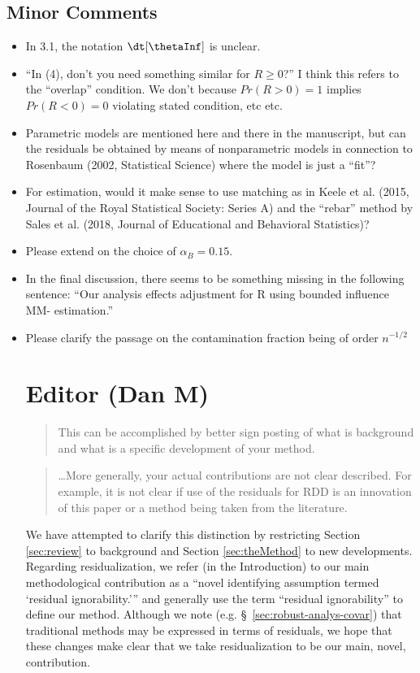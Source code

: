 \documentclass[12pt]{article}
\begin{document}
\subsection{Minor Comments}
\begin{itemize}
\item In 3.1, the notation $\dt[\thetaInf]$ is unclear.
\item ``In (4), don’t you need something similar for $R\ge 0$?'' I
  think this refers to the ``overlap'' condition. We don't because
  $Pr(R>0)=1$ implies $Pr(R<0)=0$ violating stated condition, etc etc.
\item Parametric models are mentioned here and there in the
  manuscript, but can the residuals be obtained by means of
  nonparametric models in connection to Rosenbaum (2002, Statistical
  Science) where the model is just a ``fit''?
\item For estimation, would it make sense to use matching as in Keele
  et al. (2015, Journal of the Royal Statistical Society: Series A)
  and the “rebar” method by Sales et al. (2018, Journal of Educational
  and Behavioral Statistics)?
\item Please extend on the choice of $\alpha_B=0.15$.
\item In the final discussion, there seems to be something missing in
  the following sentence: “Our analysis effects adjustment for R using
  bounded influence MM- estimation.”
\item Please clarify the passage on the contamination fraction being of
order $n^{-1/2}$


\section{Editor (Dan M)}

\begin{quote}
This can be accomplished by better sign posting of what
is background and what is a specific development of your
method.
\end{quote}
\begin{quote}
\dots More generally, your actual contributions
are not clear described. For example, it is not clear if use of the
residuals for RDD is an innovation of this paper or a method being
taken from the literature.
\end{quote}
We have attempted to clarify this distinction by restricting Section
\ref{sec:review} to background and Section \ref{sec:theMethod} to new
developments. Regarding residualization, we refer (in the
Introduction) to our main
methodological contribution as a ``novel identifying assumption termed
`residual ignorability.''' and generally use the term ``residual
ignorability'' to define our method.
Although we note (e.g. \S~\ref{sec:robust-analys-covar}) that
traditional methods may be expressed in terms of residuals, we hope
that these changes make clear that we take residualization to be our
main, novel, contribution.


\end{itemize}
\end{document}
